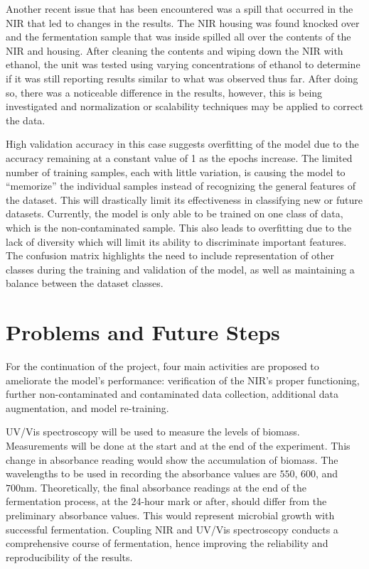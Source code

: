 \documentclass[final, 3p, 11pt]{elsarticle}
\begin{document}
Another recent issue that has been encountered was a spill that occurred in the NIR that led to changes in the results. The NIR housing was found knocked over and the fermentation sample that was inside spilled all over the contents of the NIR and housing. After cleaning the contents and wiping down the NIR with ethanol, the unit was tested using varying concentrations of ethanol to determine if it was still reporting results similar to what was observed thus far. After doing so, there was a noticeable difference in the results, however, this is being investigated and normalization or scalability techniques may be applied to correct the data. 

High validation accuracy in this case suggests overfitting of the model due to the accuracy remaining at a constant value of 1 as the epochs increase. The limited number of training samples, each with little variation, is causing the model to “memorize” the individual samples instead of recognizing the general features of the dataset. This will drastically limit its effectiveness in classifying new or future datasets. Currently, the model is only able to be trained on one class of data, which is the non-contaminated sample. This also leads to overfitting due to the lack of diversity which will limit its ability to discriminate important features. The confusion matrix highlights the need to include representation of other classes during the training and validation of the model, as well as maintaining a balance between the dataset classes. 

\section{Problems and Future Steps}
For the continuation of the project, four main activities are proposed to ameliorate the model’s performance: verification of the NIR’s proper functioning, further non-contaminated and contaminated data collection, additional data augmentation, and model re-training. 

UV/Vis spectroscopy will be used to measure the levels of biomass. Measurements will be done at the start and at the end of the experiment. This change in absorbance reading would show the accumulation of biomass. The wavelengths to be used in recording the absorbance values are $550$, $600$, and $700\text{nm}$. Theoretically, the final absorbance readings at the end of the fermentation process, at the 24-hour mark or after, should differ from the preliminary absorbance values. This would represent microbial growth with successful fermentation. Coupling NIR and UV/Vis spectroscopy conducts a comprehensive course of fermentation, hence improving the reliability and reproducibility of the results.
\end{document}
